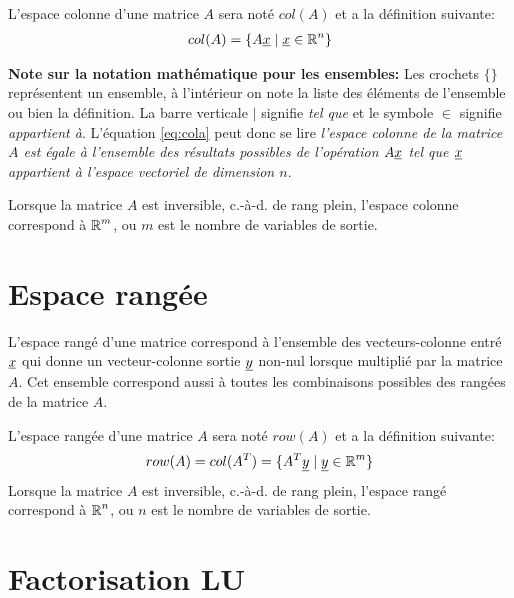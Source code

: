 L'espace colonne d'une matrice $A$ sera noté $col(A)$ et a la définition suivante:
\begin{align}
	col(A) =
	\{ A \underline{x} \; | \; \underline{x} \in \operatorname{\mathbb{R}}^n \}
	\label{eq:cola}
\end{align}

\textbf{Note sur la notation mathématique pour les ensembles:} Les crochets $\{ \}$ représentent un ensemble, à l'intérieur on note la liste des éléments de l'ensemble ou bien la définition. La barre verticale $|$ signifie \textit{tel que} et le symbole $\in$ signifie \textit{appartient à}. L'équation \eqref{eq:cola} peut donc se lire \textit{l'espace colonne de la matrice $A$ est égale à l'ensemble des résultats possibles de l'opération $A \underline{x} $ tel que $\underline{x}$ appartient à l'espace vectoriel de dimension $n$}.

Lorsque la matrice $A$ est inversible, c.-à-d. de rang plein, l'espace colonne correspond à $\operatorname{\mathbb{R}}^m$, ou $m$ est le nombre de variables de sortie.

\section{Espace rangée}
\label{sec:esprow}

L'espace rangé d'une matrice correspond à l'ensemble des vecteurs-colonne entré $\underline{x}$ qui donne un vecteur-colonne sortie $\underline{y}$ non-nul lorsque multiplié par la matrice $A$. Cet ensemble correspond aussi à toutes les combinaisons possibles des rangées de la matrice $A$.


L'espace rangée d'une matrice $A$ sera noté $row(A)$ et a la définition suivante:
\begin{align}
	row(A) =  col(A^T) =
	\{ A^T \underline{y} \; | \; \underline{y} \in \operatorname{\mathbb{R}}^m \}
\end{align}
Lorsque la matrice $A$ est inversible, c.-à-d. de rang plein, l'espace rangé correspond à $\operatorname{\mathbb{R}}^n$, ou $n$ est le nombre de variables de sortie.

\section{Factorisation LU}
\label{sec:lu}

